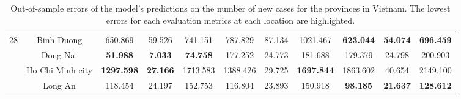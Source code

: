 \begin{landscape}
\begin{table}[!htb]
\begin{tabular}{| c | c | c | c | c | c | c | c | c | c | c |}
        \multirow{4}{*}{28}
            & Binh Duong & 650.869 & 59.526 & 741.151 & 787.829 & 87.134 & 1021.467 & \textbf{623.044} & \textbf{54.074} & \textbf{696.459} \\
            & Dong Nai & \textbf{51.988} & \textbf{7.033} & \textbf{74.758} & 177.252 & 24.773 & 181.688 & 179.379 & 24.798 & 200.903 \\
            & Ho Chi Minh city & \textbf{1297.598} & \textbf{27.166} & 1713.583 & 1388.426 & 29.725 & \textbf{1697.844} & 1863.602 & 40.654 & 2149.100 \\
            & Long An & 118.454 & 24.197 & 152.753 & 116.804 & 23.893 & 150.918 & \textbf{98.185} & \textbf{21.637} & \textbf{128.612} \\ \hline
    \end{tabular}
    \caption{Out-of-sample errors of the model's predictions on the number of new cases for the provinces in Vietnam. The lowest errors for each evaluation metrics at each location are highlighted.}
\end{table}
\end{landscape}

